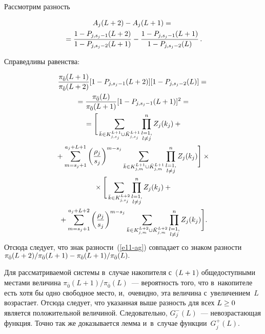 \begin{multicols}{2}
  Рассмотрим разность
  
  
  \noindent
  \begin{multline}
  A_j(L+2) -A_j(L+1) ={}\\
  {}=\displaystyle\frac{\displaystyle 1-P_{j,s_j-1}(L+2)\mathstrut}{\displaystyle 1-P_{j,s_j-2}(L+1)\mathstrut}-
   \displaystyle\frac{\displaystyle 1-P_{j,s_j-1}(L+1)\mathstrut}{\displaystyle 1-P_{j,s_j-2}(L)\mathstrut}\,.
  \label{e11-ag}
  \end{multline}
  
    \vspace*{-3pt}
  
  \noindent
  Справедливы ра\-вен\-ства:
  
  \vspace*{-3pt}
  
  \noindent
  \begin{multline*}
  \displaystyle\frac{\displaystyle \pi_{\bar{0}}(L+1)\mathstrut}{\displaystyle  \pi_{\bar{0}}(L+2)\mathstrut} [ 1-P_{j,s_j-1}(L+2)] [1-P_{j,s_j-2}(L)]={}\\
  {}=
  \displaystyle\frac{\displaystyle \pi_{\bar{0}}(L)\mathstrut}{\displaystyle  \pi_{\bar{0}}(L+1)\mathstrut} [1-P_{j,s_j-1} (L+1)]^2={}\\
  {}=
  \Bigg[ \sum\limits_{\bar{k}\in K^{L+1}_{j,s_j}\cup \bar{K}^{L+1}_{j,s_j}} 
\prod\limits^n_{{\substack{{l=1,}\\ {l\not=j}}}} Z_j(k_j)+{}\\
{}+\sum\limits^{a_j+L+1}_{m=s_j+1} \left( 
\displaystyle\frac{\displaystyle \rho_j\mathstrut}{\displaystyle s_j\mathstrut}\right)^{m-s_j} \sum\limits_{\bar{k}\in K^{L+1}_{j,m} \cup 
\bar{K}^{L+1}_{j,m}} \prod\limits^n_{{\substack{{l=1,}\\ {l\not=j}}}} Z_j(k_j)\Bigg] \times{}
\\
  {}\times
  \Bigg[ \sum\limits_{\bar{k}\in K^{L+2}_{j,s_j}} \prod\limits^n_{{\substack{{l=1,}\\ {l\not=j}}}} 
Z_j(k_j) +{}\\
{}+\sum\limits_{m=s_j+1}^{a_j+L+2} \left( \displaystyle\frac{\displaystyle \rho_j\mathstrut}{\displaystyle s_j\mathstrut}\right)^{m-s_j} 
\sum\limits_{\bar{k}\in K^{L+2}_{j,m}\cup \bar{K}^{L+2}_{j,m}} 
\prod\limits^n_{{\substack{{l=1,}\\ {l\not=j}}}} Z_j(k_j)\Bigg].
  \end{multline*}
    Отсюда следует, что знак раз\-ности~(\ref{e11-ag}) совпадает со знаком  
раз\-ности 
  ${\pi_{\bar{0}}(L+2)}/{\pi_{\bar{0}}(L+1)} \hm - {\pi_{\bar{0}}(L+1)}/{\pi_{\bar{0}}(L)}.$
  
  Для рассматриваемой сис\-те\-мы в~случае накопителя с~($L\hm+1$) 
общедоступными мес\-та\-ми величина $\pi_{\bar{0}}(L+1)/ \pi_{\bar{0}} 
(L)$~--- ве\-ро\-ят\-ность того, что в~накопителе есть хотя бы одно свободное  
мес\-то, и,~очевидно, эта величина с~увеличением~$L$ воз\-рас\-та\-ет. Отсюда 
следует, что указанная выше раз\-ность для всех $L\hm\geq 0$ является 
положительной величиной. Следовательно, $G_j^-(L)$~---  
не\-воз\-рас\-та\-ющая функция. Точ\-но так же доказывается лемма и~в~случае 
функ\-ции~$G_j^+(L)$. 
  

\end{multicols}
